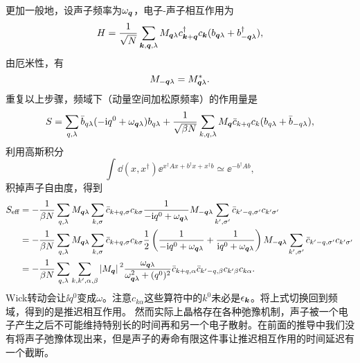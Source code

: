 更加一般地，设声子频率为$\omega_{\vb*{q}}$，电子-声子相互作用为
\begin{equation}
    H = \frac{1}{\sqrt{N}} \sum_{\vb*{k}, \vb*{q}, \lambda} M_{\vb*{q} \lambda} c^\dagger_{\vb*{k} + \vb*{q}} c_{\vb*{k}} (b_{\vb*{q} \lambda} + b_{-\vb*{q} \lambda}^\dagger),
\end{equation}
由厄米性，有
\begin{equation}
    M_{-\vb*{q} \lambda} = M^*_{\vb*{q} \lambda}.
\end{equation}
重复以上步骤，频域下（动量空间加松原频率）的作用量是
\begin{equation}
    S = \sum_{q, \lambda} \bar{b}_{q \lambda} (- \mathrm{i} q^0 + \omega_{\vb*{q} \lambda}) b_{q \lambda} + \frac{1}{\sqrt{\beta N}} \sum_{k, q, \lambda} M_{\vb*{q}} \bar{c}_{k + q} c_{k} (b_{q \lambda} + \bar{b}_{- q \lambda}),
    \label{eq:bcs-original-action-freq}
\end{equation}
利用高斯积分
\[
    \int \dd{(x, x^\dagger)} \ee^{x^\dagger A x + b^\dagger x + x^\dagger b} \simeq \ee^{- b^\dagger A b},
\]
积掉声子自由度，得到
\begin{equation}
    \begin{aligned}
        S_\text{eff} &= - \frac{1}{\beta N} \sum_{q, \lambda} M_{\vb*{q} \lambda} \sum_{k, \sigma} \bar{c}_{k+q, \sigma} c_{k \sigma} \frac{1}{- \mathrm{i} q^0 + \omega_{\vb*{q} \lambda}} M_{- \vb*{q} \lambda} \sum_{k', \sigma'} \bar{c}_{k' - q, \sigma'} c_{k' \sigma'} \\
        &= - \frac{1}{\beta N} \sum_{q, \lambda} M_{\vb*{q} \lambda} \sum_{k, \sigma} \bar{c}_{k+q, \sigma} c_{k \sigma} \frac{1}{2} \left( \frac{1}{- \mathrm{i} q^0 + \omega_{\vb*{q} \lambda}} + \frac{1}{\mathrm{i} q^0 + \omega_{\vb*{q} \lambda}} \right) M_{- \vb*{q} \lambda} \sum_{k', \sigma'} \bar{c}_{k' - q, \sigma'} c_{k' \sigma'} \\
        &= - \frac{1}{\beta N} \sum_{q, \lambda} \sum_{k, k', \alpha, \beta} \abs*{M_{\vb*{q}}}^2 \frac{\omega_{\vb*{q} \lambda}}{\omega_{\vb*{q} \lambda}^2 + (q^0)^2} \bar{c}_{k + q, \alpha} \bar{c}_{k' - q, \beta} c_{k' \beta} c_{k \alpha}.
    \end{aligned}
    \label{eq:integrating-out-phonon}
\end{equation}
Wick转动会让$\ii q^0$变成$\omega$。注意$c_{k \alpha}$这些算符中的$k^0$未必是$\epsilon_{\vb*{k}}$。将上式切换回到频域，得到的是推迟相互作用。
然而实际上晶格存在各种弛豫机制，声子被一个电子产生之后不可能维持特别长的时间再和另一个电子散射。在前面的推导中我们没有将声子弛豫体现出来，但是声子的寿命有限这件事让推迟相互作用的时间延迟有一个截断。
